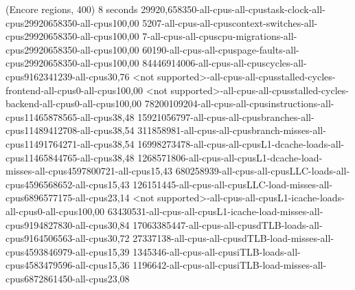 (Encore regions, 400)
8 seconds
29920,658350-all-cpus-all-cpustask-clock-all-cpus29920658350-all-cpus100,00
5207-all-cpus-all-cpuscontext-switches-all-cpus29920658350-all-cpus100,00
7-all-cpus-all-cpuscpu-migrations-all-cpus29920658350-all-cpus100,00
60190-all-cpus-all-cpuspage-faults-all-cpus29920658350-all-cpus100,00
84446914006-all-cpus-all-cpuscycles-all-cpus9162341239-all-cpus30,76
<not supported>-all-cpus-all-cpusstalled-cycles-frontend-all-cpus0-all-cpus100,00
<not supported>-all-cpus-all-cpusstalled-cycles-backend-all-cpus0-all-cpus100,00
78200109204-all-cpus-all-cpusinstructions-all-cpus11465878565-all-cpus38,48
15921056797-all-cpus-all-cpusbranches-all-cpus11489412708-all-cpus38,54
311858981-all-cpus-all-cpusbranch-misses-all-cpus11491764271-all-cpus38,54
16998273478-all-cpus-all-cpusL1-dcache-loads-all-cpus11465844765-all-cpus38,48
1268571806-all-cpus-all-cpusL1-dcache-load-misses-all-cpus4597800721-all-cpus15,43
680258939-all-cpus-all-cpusLLC-loads-all-cpus4596568652-all-cpus15,43
126151445-all-cpus-all-cpusLLC-load-misses-all-cpus6896577175-all-cpus23,14
<not supported>-all-cpus-all-cpusL1-icache-loads-all-cpus0-all-cpus100,00
63430531-all-cpus-all-cpusL1-icache-load-misses-all-cpus9194827830-all-cpus30,84
17063385447-all-cpus-all-cpusdTLB-loads-all-cpus9164506563-all-cpus30,72
27337138-all-cpus-all-cpusdTLB-load-misses-all-cpus4593846979-all-cpus15,39
1345346-all-cpus-all-cpusiTLB-loads-all-cpus4583479596-all-cpus15,36
1196642-all-cpus-all-cpusiTLB-load-misses-all-cpus6872861450-all-cpus23,08
